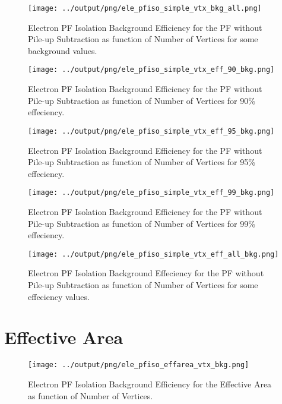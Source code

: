 \documentclass[11pt]{book}
\begin{document}
\begin{figure}[htb]
\centering
\texttt{[image: ../output/png/ele\_pfiso\_simple\_vtx\_bkg\_all.png]}
\caption{Electron PF Isolation Background Efficiency for the PF without Pile-up Subtraction as function of Number of Vertices for some background values.}
\label{fig:ele_pfiso_vtx_bkg_simple_bkg_all}
\end{figure}

\begin{figure}[htb]
\centering
\texttt{[image: ../output/png/ele\_pfiso\_simple\_vtx\_eff\_90\_bkg.png]}
\caption{Electron PF Isolation Background Efficiency for the PF without Pile-up Subtraction as function of Number of Vertices for 90\% effeciency.}
\label{fig:ele_pfiso_vtx_eff_simple_eff_90_bkg}
\end{figure}

\begin{figure}[htb]
\centering
\texttt{[image: ../output/png/ele\_pfiso\_simple\_vtx\_eff\_95\_bkg.png]}
\caption{Electron PF Isolation Background Efficiency for the PF without Pile-up Subtraction as function of Number of Vertices for 95\% effeciency.}
\label{fig:ele_pfiso_vtx_eff_simple_eff_95_bkg}
\end{figure}

\begin{figure}[htb]
\centering
\texttt{[image: ../output/png/ele\_pfiso\_simple\_vtx\_eff\_99\_bkg.png]}
\caption{Electron PF Isolation Background Efficiency for the PF without Pile-up Subtraction as function of Number of Vertices for 99\% effeciency.}
\label{fig:ele_pfiso_vtx_eff_simple_eff_99_bkg}
\end{figure}

\begin{figure}[htb]
\centering
\texttt{[image: ../output/png/ele\_pfiso\_simple\_vtx\_eff\_all\_bkg.png]}
\caption{Electron PF Isolation Background Effeciency for the PF without Pile-up Subtraction as function of Number of Vertices for some effeciency values.}
\label{fig:ele_pfiso_vtx_eff_simple_eff_all_bkg}
\end{figure}
\clearpage

\section{Effective Area}
\begin{figure}[htb]
\centering
\texttt{[image: ../output/png/ele\_pfiso\_effarea\_vtx\_bkg.png]}
\caption{Electron PF Isolation Background Efficiency for the Effective Area as function of Number of Vertices.}
\label{fig:ele_pfiso_vtx_bkg_effarea}
\end{figure}
\end{document}
